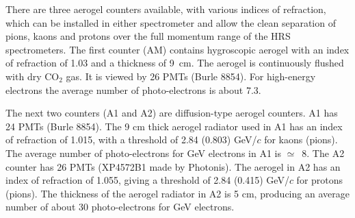 {There are  three aerogel \Cherenkov{} counters available, with various indices
of refraction, which can be installed in either spectrometer and allow 
the clean separation of pions, kaons and protons over the full momentum 
range of the HRS spectrometers.
The first counter (AM) contains hygroscopic aerogel with an index of refraction 
of 1.03 and a thickness of 9~cm. 
The aerogel is continuously flushed with dry CO$_{2}$ gas.  
It is viewed by 26 PMTs (Burle 8854). 
For high-energy electrons the average number of photo-electrons is about 7.3. 

The next two counters (A1 and A2) are diffusion-type aerogel 
counters. A1 has 24 PMTs (Burle 8854). 
The 9 cm thick aerogel radiator used in A1 has an index of refraction of 1.015, 
with a threshold of 2.84 (0.803) GeV/$c$ for kaons (pions). 
The average number of photo-electrons for GeV electrons 
in A1 is $\simeq$~8. The A2 counter has 26 PMTs (XP4572B1 made by Photonis). 
The aerogel in A2 has an index of refraction of 1.055, 
giving a threshold of 2.84 (0.415) GeV/$c$ for protons (pions). 
The thickness of the aerogel radiator in A2 is 5 cm, producing an average 
number of about 30 photo-electrons for GeV electrons.
}

